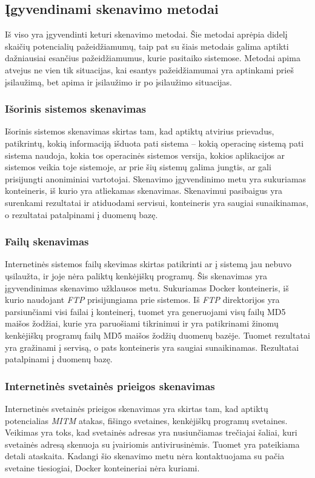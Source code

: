 \documentclass[a4paper,12pt,fleqn]{article}
\begin{document}
\subsection{Įgyvendinami skenavimo metodai}

Iš viso yra įgyvendinti keturi skenavimo metodai. Šie metodai aprėpia didelį skaičių potencialių pažeidžiamumų, taip pat su šiais metodais galima aptikti dažniausiai esančius pažeidžiamumus, kurie pasitaiko sistemose. Metodai apima atvejus ne vien tik situacijas, kai esantys pažeidžiamumai yra aptinkami prieš įsilaužimą, bet apima ir įsilaužimo ir po įsilaužimo situacijas.

\subsubsection{Išorinis sistemos skenavimas}
\label{sec:scanOutside}
Išorinis sistemos skenavimas skirtas tam, kad aptiktų atvirius prievadus, patikrintų, kokią informaciją išduota pati sistema – kokią operacinę sistemą pati sistema naudoja, kokia tos operacinės sistemos versija, kokios aplikacijos ar sistemos veikia toje sistemoje, ar prie šių sistemų galima jungtis, ar gali prisijungti anoniminiai vartotojai. Skenavimo įgyvendinimo metu yra sukuriamas konteineris, iš kurio yra atliekamas skenavimas. Skenavimui pasibaigus yra surenkami rezultatai ir atiduodami servisui, konteineris yra saugiai sunaikinamas, o rezultatai patalpinami į duomenų bazę.
\subsubsection{Failų skenavimas}
\label{sec:scanFile}
Internetinės sistemos failų skevimas skirtas patikrinti ar į sistemą jau nebuvo ųsilaužta, ir joje nėra paliktų kenkėjiškų programų. Šis skenavimas yra įgyvendinimas skenavimo užklausos metu. Sukuriamas Docker konteineris, iš kurio naudojant \textit{FTP} prisijungiama prie sistemos. Iš \textit{FTP} direktorijos yra parsiunčiami visi failai į konteinerį, tuomet yra generuojami visų failų MD5 maišos žodžiai, kurie yra paruošiami tikrinimui ir yra patikrinami žinomų kenkėjiškų programų failų MD5 maišos žodžių duomenų bazėje. Tuomet rezultatai yra gražinami į servisą, o pats konteineris yra saugiai sunaikinamas. Rezultatai patalpinami į duomenų bazę.
\subsubsection{Internetinės svetainės prieigos skenavimas}
\label{sec:scanUrl}
Internetinės svetainės prieigos skenavimas yra skirtas tam, kad aptiktų potencialias \textit{MITM} atakas, fišingo svetaines, kenkėjiškų programų svetaines. Veikimas yra toks, kad svetainės adresas yra nusiunčiamas trečiajai šaliai, kuri svetainės adresą skenuoja su įvairiomis antivirusinėmis. Tuomet yra pateikiama detali ataskaita. Kadangi šio skenavimo metu nėra kontaktuojama su pačia svetaine tiesiogiai, Docker konteineriai nėra kuriami.
\end{document}
